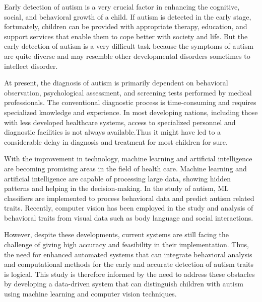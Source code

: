 Early detection of autism is a very crucial factor in enhancing the cognitive, social, and behavioral growth of a child\cite{okoye2023early}. If autism is detected in the early stage, fortunately, children can be provided with appropriate therapy, education, and support services that enable them to cope better with society and life. But the early detection of autism is a very difficult task because the symptoms of autism are quite diverse and may resemble other developmental disorders sometimes to intellect disorder.

At present, the diagnosis of autism is primarily dependent on behavioral observation, psychological assessment, and screening tests performed by medical professionals. The conventional diagnostic process is time-consuming and requires specialized knowledge and experience. In most developing nations, including those with less developed healthcare systems, access to specialized personnel and diagnostic facilities is not always available.Thus it might have led to a considerable delay in diagnosis and treatment for most children for sure.

With the improvement in technology, machine learning and artificial intelligence are becoming promising areas in the field of health care\cite{hossain2023smart}. Machine learning and artificial intelligence are capable of processing large data, showing hidden patterns and helping in the decision-making. In the study of autism, ML classifiers are implemented to process behavioral data and predict autism related traits. Recently, computer vision has been employed in the study and analysis of behavioral traits from visual data such as body language and social interactions.

However, despite these developments, current systems are still facing the challenge of giving high accuracy and feasibility in their implementation. Thus, the need for enhanced automated systems that can integrate behavioral analysis and computational methods for the early and accurate detection of autism traits is logical. This study is therefore informed by the need to address these obstacles by developing a data-driven system that can distinguish children with autism using machine learning and computer vision techniques.

